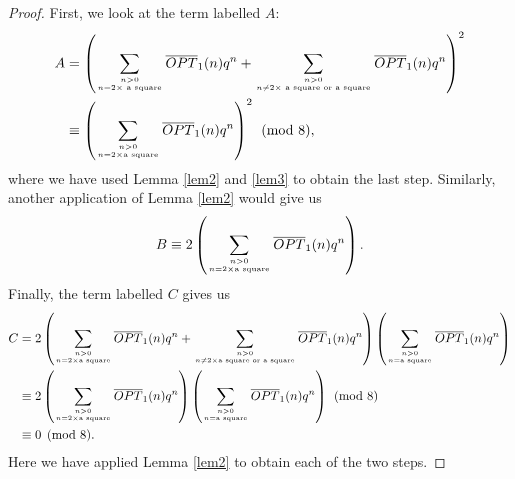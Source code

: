 \documentclass[12pt,reqno]{amsart}
\numberwithin{equation}{section}
\newcommand\mycom[2]{\genfrac{}{}{0pt}{}{#1}{#2}}
\newcommand{\opt}{\overline{OPT}}
\begin{document}
\begin{proof}
First, we look at the term labelled $A$:
\begin{align*}
    A&=\left(\sum_{\mycom{n>0}{n=2\times \text{ a square}}}\opt_1(n)q^n+\sum_{\mycom{n>0}{n\neq 2\times \text{ a square or a square}}}\opt_1(n)q^n\right)^2\\
    &\equiv \left(\sum_{\mycom{n>0}{n=2\times \text{a square}}}\opt_1(n)q^n\right)^2 \pmod 8,
\end{align*}
where we have used Lemma \ref{lem2} and \ref{lem3} to obtain the last step. Similarly, another application of Lemma \ref{lem2} would give us
\[
B\equiv 2\left(\sum_{\mycom{n>0}{n=2\times \text{a square}}}\opt_1(n)q^n\right).
\]
Finally, the term labelled $C$ gives us
\begin{align*}
    C&=2\left(\sum_{\mycom{n>0}{n=2\times \text{a square}}}\opt_1(n)q^n+\sum_{\mycom{n>0}{n\neq 2\times \text{a square or a square}}}\opt_1(n)q^n\right)\left(\sum_{\mycom{n>0}{n= \text{a square}}}\opt_1(n)q^n\right)\\
    &\equiv 2\left(\sum_{\mycom{n>0}{n=2\times \text{a square}}}\opt_1(n)q^n\right)\left(\sum_{\mycom{n>0}{n= \text{a square}}}\opt_1(n)q^n\right) \pmod 8\\
    &\equiv 0 \pmod 8.
\end{align*}
Here we have applied Lemma \ref{lem2} to obtain each of the two steps.


\end{proof}
\end{document}
